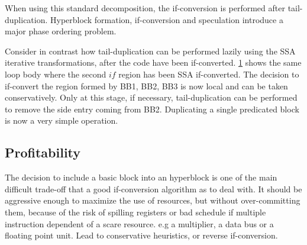 \begin{figure}[h]
{    \label{fig:hyper4}}
\end{figure}

When using this standard decomposition, the if-conversion is performed after tail-duplication. Hyperblock formation, if-conversion and speculation introduce a major phase ordering problem. 

Consider in contrast how tail-duplication can be performed lazily using the SSA iterative transformations, after the code have been if-converted. \ref{fig:hyper4} shows the same loop body where the second $if$ region has been SSA if-converted. The decision to if-convert the region formed by {BB1, BB2, BB3} is now local and can be taken conservatively. Only at this stage, if necessary, tail-duplication can be performed to remove the side entry coming from BB2. Duplicating a single predicated block is now a very simple operation.

\subsection{Profitability}

The decision to include a basic block into an hyperblock is one of the main difficult trade-off that a good if-conversion algorithm as to deal with. It should be aggressive enough to maximize the use of resources, but without over-committing them, because of the risk of spilling registers or bad schedule if multiple instruction dependent of a scare resource. e.g a multiplier, a data bus or a floating point unit. Lead to conservative heuristics, or reverse if-conversion.

